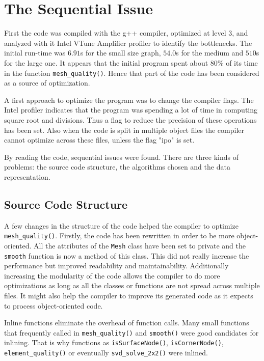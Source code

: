 \documentclass[fleqn,11pt]{SelfArx} %
\theoremstyle{definition}
\begin{document}
\section{The Sequential Issue}
First the code was compiled with the g++ compiler, optimized at level 3, and analyzed with it Intel VTune Amplifier profiler to identify the bottlenecks. The initial run-time was $6.91$s for the small size graph, $54.0$s for the medium and $510$s for the large one. It appears that the initial program spent about 80\% of its time in the function \verb+mesh_quality()+. Hence that part of the code has been considered as a source of optimization.

A first approach to optimize the program was to change the compiler flags. The Intel profiler indicates that the program was spending a lot of time in computing square root and divisions. Thus a flag to reduce the precision of these operations has been set. Also when the code is split in multiple object files the compiler cannot optimize across these files, unless the flag "ipo" is set.

By reading the code, sequential issues were found. There are three kinds of problems: the source code structure, the algorithms chosen and the data representation.

\subsection{Source Code Structure}

A few changes in the structure of the code helped the compiler to optimize \verb+mesh_quality()+. Firstly, the code has been rewritten in order to be more object-oriented. All the attributes of the \verb+Mesh+ class have been set to private and the \verb+smooth+ function is now a method of this class. This did not really increase the performance but improved readability and maintainability. Additionally increasing the modularity of the code allows the compiler to do more optimizations as long as all the classes or functions are not spread across multiple files. It might also help the compiler to improve its generated code as it expects to process object-oriented code. 

Inline functions eliminate the overhead of function calls. Many small functions that frequently called in \verb+mesh_quality()+ and \verb+smooth()+ were good candidates for inlining. That is why functions as \verb+isSurfaceNode()+, \verb+isCornerNode()+, \verb+element_quality()+ or eventually \verb+svd_solve_2x2()+ were inlined.
\end{document}
